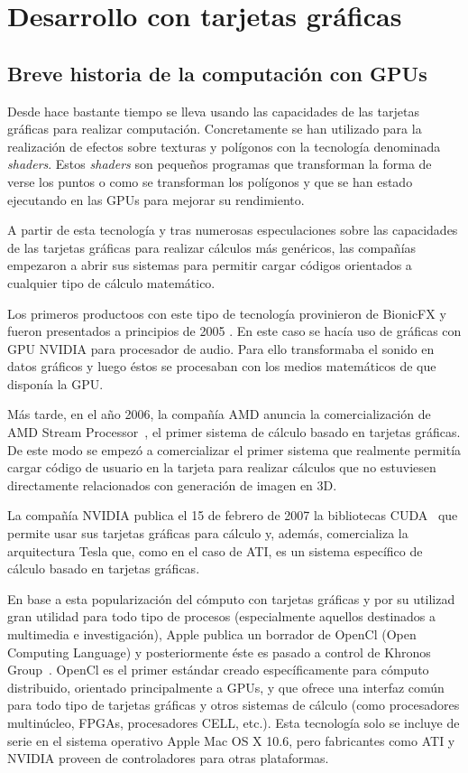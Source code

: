\chapter{Desarrollo con tarjetas gráficas}

\section{Breve historia de la computación con GPUs}

Desde hace bastante tiempo se lleva usando las capacidades de las tarjetas gráficas para realizar computación. Concretamente se han utilizado para la realización de efectos sobre texturas y polígonos con la tecnología denominada \emph{shaders}. Estos \emph{shaders} son pequeños programas que transforman la forma de verse los puntos o como se transforman los polígonos y que se han estado ejecutando en las GPUs para mejorar su rendimiento.

A partir de esta tecnología y tras numerosas especulaciones sobre las capacidades de las tarjetas gráficas para realizar cálculos más genéricos, las compañías empezaron a abrir sus sistemas para permitir cargar códigos orientados a cualquier tipo de cálculo matemático.

Los primeros productoos con este tipo de tecnología provinieron de BionicFX y fueron presentados a principios de 2005 \cite{website:extremetech_gpu_audio}. En este caso se hacía uso de gráficas con GPU NVIDIA para procesador de audio. Para ello transformaba el sonido en datos gráficos y luego éstos se procesaban con los medios matemáticos de que disponía la GPU.

Más tarde, en el año 2006, la compañía AMD anuncia la comercialización de AMD Stream Processor~\cite{website:amd_press_stream}, el primer sistema de cálculo basado en tarjetas gráficas. De este modo se empezó a comercializar el primer sistema que realmente permitía cargar código de usuario en la tarjeta para realizar cálculos que no estuviesen directamente relacionados con generación de imagen en 3D.

La compañía NVIDIA publica el 15 de febrero de 2007 la bibliotecas CUDA~\cite{website:nvidia_press_cuda} que permite usar sus tarjetas gráficas para cálculo y, además, comercializa la arquitectura Tesla que, como en el caso de ATI, es un sistema específico de cálculo basado en tarjetas gráficas.

En base a esta popularización del cómputo con tarjetas gráficas y por  su utilizad gran utilidad para todo tipo de procesos (especialmente aquellos destinados a multimedia e investigación), Apple publica un borrador de OpenCl (Open Computing Language) y posteriormente éste es pasado a control de Khronos Group~\cite{website:khronos_press_opencl}. OpenCl es  el primer estándar creado específicamente para cómputo distribuido, orientado principalmente a GPUs, y que ofrece una interfaz común para todo tipo de tarjetas gráficas y otros sistemas de cálculo (como procesadores multinúcleo, FPGAs, procesadores CELL, etc.). Esta tecnología solo se incluye de serie en el sistema operativo Apple Mac OS X 10.6, pero fabricantes como ATI y NVIDIA proveen de controladores para otras plataformas.

